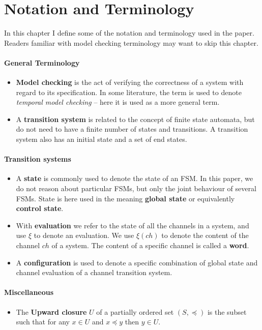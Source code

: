 \section{Notation and Terminology}
\label{notation}
In this chapter I define some of the notation and terminology used in the paper. Readers familiar with model checking terminology may want to skip this chapter.

\paragraph{General Terminology}
\begin{itemize}
\item
\textbf{Model checking} is the act of verifying the correctness of a system with regard to its specification. In some literature, the term is used to denote \emph{temporal model checking} -- here it is used as a more general term.

\item
A \textbf{transition system} is related to the concept of finite state automata, but do not need to have a finite number of states and transitions. A transition system also has an initial state and a set of end states.
\end{itemize}


\paragraph{Transition systems}
\begin{itemize}
\item
A \textbf{state} is commonly used to denote the state of an FSM. In this paper, we do not reason about particular FSMs, but only the joint behaviour of several FSMs. State is here used in the meaning \textbf{global state} or equivalently \textbf{control state}.

\item
With \textbf{evaluation} we refer to the state of all the channels in a system, and use $\xi$ to denote an evaluation. We use $\xi(ch)$ to denote the content of the channel $ch$ of a system. The content of a specific channel is called a \textbf{word}.

\item
A \textbf{configuration} is used to denote a specific combination of global state and channel evaluation of a channel transition system. 
\end{itemize}

\paragraph{Miscellaneous}
\begin{itemize}
\item
The \textbf{Upward closure} $U$ of a partially ordered set $(S,\preceq)$ is the subset such that for any $x \in U$ and $x\preceq y$ then $y \in U$.
\end{itemize}
